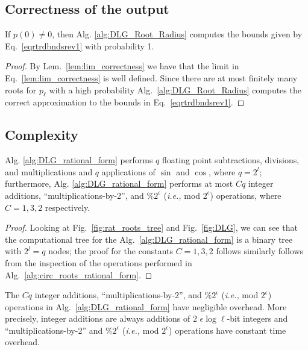 \documentclass[runningheads]{llncs}
\begin{document}
\subsection{Correctness of the output}
\begin{theorem}\label{thm:lim_correctness}
 If $p(0) \neq 0$, then Alg. \ref{alg:DLG_Root_Radius} computes the bounds given by Eq.~\ref{eqrtrdbndsrev1}  with probability 1.
\end{theorem}
\begin{proof}
By Lem.~\ref{lem:lim_correctness} we have that the limit in Eq.~\ref{lem:lim_correctness} is well defined. Since there are at most finitely many roots for $p_\ell$ with a high probability Alg.~\ref{alg:DLG_Root_Radius} computes the correct approximation to the bounds in Eq.~\ref{eqrtrdbndsrev1}.
\end{proof}

\subsection{Complexity}
\begin{theorem}\label{thm:float_ops}
Alg. \ref{alg:DLG_rational_form} performs $q $ floating point subtractions, divisions, and multiplications and $q $ applications of $\sin$ and $\cos$, where $q = 2^l$; furthermore, Alg. \ref{alg:DLG_rational_form} performs at most $Cq $  integer additions, ``multiplications-by-2'', and $ \%2^\epsilon $ (\emph{i.e.,} mod $ 2^\epsilon $) operations, where $C=1,3,2$ respectively.
\end{theorem}
\begin{proof}
Looking at Fig.~\ref{fig:rat_roots_tree} and Fig.~\ref{fig:DLG}, we can see that the computational tree for the Alg.~\ref{alg:DLG_rational_form} is a binary tree with $2^l = q$ nodes; the proof for the constants $C=1,3,2$ follows similarly follows from the inspection of the operations performed in Alg.~\ref{alg:circ_roots_rational_form}.
\end{proof}

\begin{theorem}\label{thm:ints}
The $Cq $  integer additions, ``multiplications-by-2'', and $ \%2^\epsilon $ (\emph{i.e.,} mod $ 2^\epsilon $) operations in Alg.~\ref{alg:DLG_rational_form} have negligible overhead. More precisely, integer additions are always additions of 2 $\epsilon \log \ell $-bit integers and ``multiplications-by-2'' and $ \%2^\epsilon $ (\emph{i.e.,} mod $ 2^\epsilon $) operations have constant time overhead.
\end{theorem}
\end{document}
